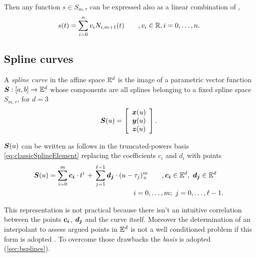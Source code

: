 \documentclass[dissertation.tex]{subfiles}
\begin{document}
Then any function $s\in S_{m,\tau}$ can be expressed also as a linear
combination of \bss,
\begin{equation}\label{eq:bsplineElement}
  s(t)=\sum_{i=0}^nv_i N_{i,m+1}(t)\qquad, v_i\in\mathbb{R}, i=0,\dots,n.
\end{equation}

\subsection{Spline curves}
A \emph{spline curve} in the affine space $\mathbb{E}^d$ is the image of a
parametric vector function $\boldsymbol{S}:[a,b]\rightarrow\mathbb{E}^d$ whose
components are all splines belonging to a fixed spline space
$S_{m,\tau}$, for $d=3$
\begin{equation}\label{eq:bsplineCurveComp}
  \boldsymbol{S}(u) = \left[
    \begin{array}{c}
      \boldsymbol{x}(u)\\
      \boldsymbol{y}(u)\\
      \boldsymbol{z}(u)
    \end{array}
    \right].
\end{equation}

$\boldsymbol{S}(u)$ can be written as follows in the
truncated-powers basis
\cref{eq:classicSplineElement} replacing the coefficients $c_i$ and
$d_i$ with points
\begin{equation}\label{eq:classicSplineCurve}
  \begin{multlined}
  \ve{S}(u)=\sum_{i=0}^m \ve{c_i}\cdot t^i\, +\, \sum_{j=1}^{\ell-1}
  \ve{d_j}\cdot (u-\tau_j)_+^m\qquad,\ve{c_i}\in\mE^d,\
  \ve{d_j}\in\mE^d\\
  i=0,\dots,m;\ j=0,\dots,\ell-1.
  \end{multlined}
\end{equation}

This representation is not practical because
there isn't an intuitive correlation between the points
$\boldsymbol{c_i}$, $\boldsymbol{d_j}$ and the curve itself. Moreover the
determination of an interpolant to assess argued points in $\mathbb{E}^d$
is not a well conditioned problem if this form is adopted
\cite{deboor}. To overcome those drawbacks the \emph{\bss
  basis} is adopted (\cref{sec:bsplines}).
\end{document}
